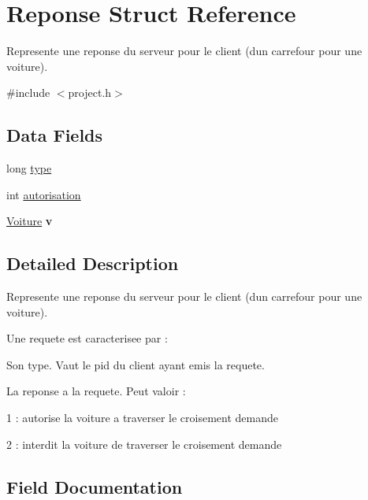 \hypertarget{struct_reponse}{}\section{Reponse Struct Reference}
\label{struct_reponse}


Represente une reponse du serveur pour le client (d\textquotesingle{}un carrefour pour une voiture).  




{\ttfamily \#include $<$project.\+h$>$}

\subsection*{Data Fields}
\begin{DoxyCompactItemize}
\item 
long \hyperlink{struct_reponse_a6a83a8677f7c78fd146859325e08209a}{type}
\item 
int \hyperlink{struct_reponse_a9ae59baa7d0f7ac15cc2090faf0b5b43}{autorisation}
\item 
\hypertarget{struct_reponse_a76a64000aab59dcc4195c1b6e1605eb3}{}\hyperlink{struct_voiture}{Voiture} {\bfseries v}\label{struct_reponse_a76a64000aab59dcc4195c1b6e1605eb3}

\end{DoxyCompactItemize}


\subsection{Detailed Description}
Represente une reponse du serveur pour le client (d\textquotesingle{}un carrefour pour une voiture). 

Une requete est caracterisee par \+:
\begin{DoxyItemize}
\item Son type. Vaut le pid du client ayant emis la requete.
\item La reponse a la requete. Peut valoir \+:
\begin{DoxyItemize}
\item 1 \+: autorise la voiture a traverser le croisement demande
\item 2 \+: interdit la voiture de traverser le croisement demande 
\end{DoxyItemize}
\end{DoxyItemize}

\subsection{Field Documentation}
\hypertarget{struct_reponse_a9ae59baa7d0f7ac15cc2090faf0b5b43}{}
